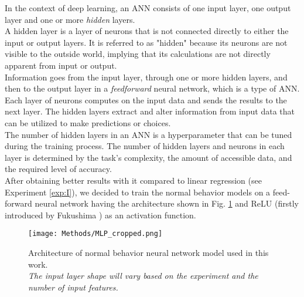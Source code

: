     In the context of deep learning, an ANN consists of one input layer, one output layer and one or more \emph{hidden} layers.\\
    A hidden layer is a layer of neurons that is not connected directly to either the input or output layers. 
    It is referred to as "hidden" because its neurons are not visible to the outside world, implying that its calculations are not directly apparent from input or output.\\
    Information goes from the input layer, through one or more hidden layers, and then to the output layer in a \emph{feedforward} neural network, which is a type of ANN. 
    Each layer of neurons computes on the input data and sends the results to the next layer. The hidden layers extract and alter information from input data that can be 
    utilized to make predictions or choices.\\
    The number of hidden layers in an ANN is a hyperparameter that can be tuned during the training process.
    The number of hidden layers and neurons in each layer is determined by the task's complexity, the amount of accessible data, and the required level of accuracy.\\
    After obtaining better results with it compared to linear regression (see Experiment \ref{exp:I}), we decided to train the normal behavior models
    on a feed-forward neural network having the architecture shown in Fig. \ref{fig:MLP} and ReLU (firstly introduced by Fukushima \cite{Fukushima}) as an activation function.

    \begin{figure}[H]
      \begin{center}
        \texttt{[image: Methods/MLP\_cropped.png]}
      \end{center}
      \caption{Architecture of normal behavior neural network model used in this work. \\
      \emph{The input layer shape will vary based on the experiment and the number of input features.}}
      \label{fig:MLP}
    \end{figure}

